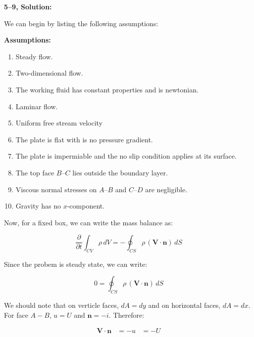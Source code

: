 \documentclass[letterpaper,12pt]{article}
\begin{document}
\vspace{6pt}


\textbf{5--9, Solution:}

We can begin by listing the following assumptions:

\textbf{Assumptions:}
\begin{enumerate}
    \item Steady flow.
    \item Two-dimensional flow.
    \item The working fluid has constant properties and is newtonian.
    \item Laminar flow.
    \item Uniform free stream velocity
    \item The plate is flat with is no pressure gradient.
    \item The plate is impermiable and the no slip condition applies at its surface.
    \item The top face $B$--$C$ lies outside the boundary layer.
    \item Viscous normal stresses on $A$--$B$ and $C$--$D$ are negligible.
    \item Gravity has no $x$-component.
\end{enumerate}

Now, for a fixed box, we can write the mass balance as:

\begin{equation}
    \frac{\partial}{\partial t}\int_{CV}\rho\,dV=-\oint_{CS}\rho\,(\mathbf V\cdot\mathbf n)\,dS
\end{equation}

Since the probem is steady state, we can write:

\begin{equation}
    0=\oint_{CS}\rho\,(\mathbf V\cdot\mathbf n)\,dS
\end{equation}

We should note that on verticle faces, $dA = dy$ and on horizontal faces, $dA = dx$. For face $A-B$, $u = U$ and $\mathbf{n} = -i$. Therefore:

\begin{equation}
\begin{aligned}
    \mathbf{V} \cdot \mathbf{n} &= -u 
                                &= -U
\end{aligned}
\end{equation}
\end{document}
